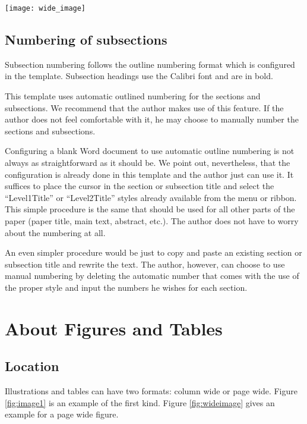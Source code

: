 \documentclass[final]{imeko_acta}
\begin{document}
\begin{figure*}[!b]
	\centering
	\texttt{[image: wide\_image]}
	\caption{Shakuhachi: old Japanese length standard: 1 shaku = 30.3 cm}
	\label{fig:wideimage}
\end{figure*}

\subsection{Numbering of subsections}

Subsection numbering follows the outline numbering format which is configured in the template. Subsection headings use the Calibri font and are in bold.

This template uses automatic outlined numbering for the sections and subsections. We recommend that the author makes use of this feature. If the author does not feel comfortable with it, he may choose to manually number the sections and subsections.

Configuring a blank Word document to use automatic outline numbering is not always as straightforward as it should be. We point out, nevertheless, that the configuration is already done in this template and the author just can use it. It suffices to place the cursor in the section or subsection title and select the ``Level1Title'' or ``Level2Title'' styles already available from the menu or ribbon. This simple procedure is the same that should be used for all other parts of the paper (paper title, main text, abstract, etc.). The author does not have to worry about the numbering at all.

An even simpler procedure would be just to copy and paste an existing section or subsection title and rewrite the text. The author, however, can choose to use manual numbering by deleting the automatic number that comes with the use of the proper style and input the numbers he wishes for each section.

\section{About Figures and Tables}


\subsection{Location}

Illustrations and tables can have two formats: column wide or page wide. 
Figure \ref{fig:image1} is an example of the first kind\cite{Fazio1995}. 
Figure \ref{fig:wideimage} gives an example for a page wide figure.
\end{document}
